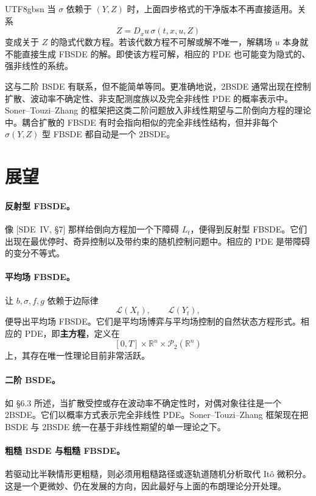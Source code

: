 \documentclass{article}
\theoremstyle{plain}
\theoremstyle{definition}
\theoremstyle{remark}
\numberwithin{equation}{section}
\newcommand{\R}{\mathbb{R}}
\begin{document}
\begin{CJK*}{UTF8}{gbsn}
当 $\sigma$ 依赖于 $(Y,Z)$ 时，上面四步格式的干净版本不再直接适用。关系
\[
  Z=D_xu\,\sigma(t,x,u,Z)
\]
变成关于 $Z$ 的隐式代数方程。若该代数方程不可解或解不唯一，解耦场 $u$ 本身就不能直接生成 FBSDE 的解。即使该方程可解，相应的 PDE 也可能变为隐式的、强非线性的系统。

这与二阶 BSDE 有联系，但不能简单等同。更准确地说，2BSDE 通常出现在控制扩散、波动率不确定性、非支配测度族以及完全非线性 PDE 的概率表示中。Soner--Touzi--Zhang 的框架把这类二阶问题放入非线性期望与二阶倒向方程的理论中。耦合扩散的 FBSDE 有时会指向相似的完全非线性结构，但并非每个 $\sigma(Y,Z)$ 型 FBSDE 都自动是一个 2BSDE。

\section{展望}

\paragraph{反射型 FBSDE。}
像 [SDE~IV, \S7] 那样给倒向方程加一个下障碍 $L_t$，便得到反射型 FBSDE。它们出现在最优停时、奇异控制以及带约束的随机控制问题中。相应的 PDE 是带障碍的变分不等式。

\paragraph{平均场 FBSDE。}
让 $b,\sigma,f,g$ 依赖于边际律
\[
  \mathcal L(X_t),\qquad \mathcal L(Y_t),
\]
便导出平均场 FBSDE。它们是平均场博弈与平均场控制的自然状态方程形式。相应的 PDE，即\textbf{主方程}，定义在
\[
  [0,T]\times\R^n\times\mathcal P_2(\R^n)
\]
上，其存在唯一性理论目前非常活跃。

\paragraph{二阶 BSDE。}
如 \S6.3 所述，当扩散受控或存在波动率不确定性时，对偶对象往往是一个 2BSDE。它们以概率方式表示完全非线性 PDE。Soner--Touzi--Zhang 框架现在把 BSDE 与 2BSDE 统一在基于非线性期望的单一理论之下。

\paragraph{粗糙 BSDE 与粗糙 FBSDE。}
若驱动比半鞅情形更粗糙，则必须用粗糙路径或逐轨道随机分析取代 It\^o 微积分。这是一个更微妙、仍在发展的方向，因此最好与上面的布朗理论分开处理。


\end{CJK*}
\end{document}
